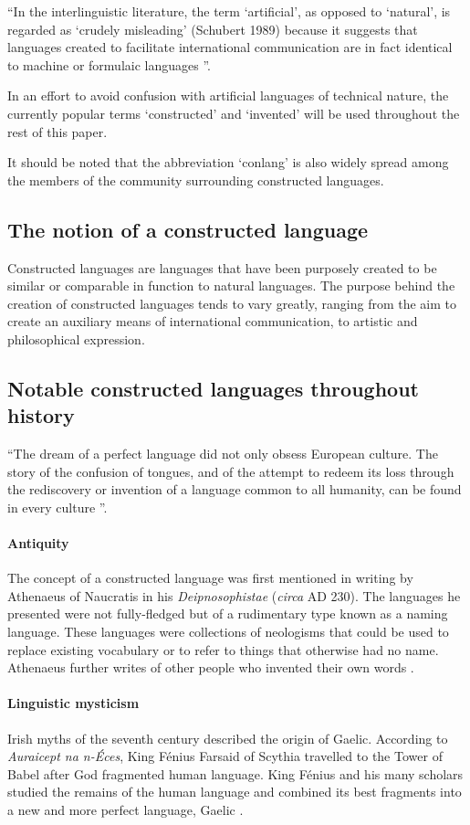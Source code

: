 \documentclass[14pt, a4paper]{extreport}
\begin{document}
``In the interlinguistic literature, the term `artificial', as opposed to `natural', is regarded as `crudely misleading' (Schubert 1989) because it suggests that languages created to facilitate international communication are in fact identical to machine or formulaic languages \parencite[45]{stria}''.

In an effort to avoid confusion with artificial languages of technical nature, the currently popular terms `constructed' and `invented' will be used throughout the rest of this paper.

It should be noted that the abbreviation `conlang' is also widely spread among the members of the community surrounding constructed languages.
\subsection{The notion of a constructed language}
Constructed languages are languages that have been purposely created to be similar or comparable in function to natural languages. The purpose behind the creation of constructed languages tends to vary greatly, ranging from the aim to create an auxiliary means of international communication, to artistic and philosophical expression.
    \subsection{Notable constructed languages throughout history}
``The dream of a perfect language did not only obsess European culture. The story of the confusion of tongues, and of the attempt to redeem its loss through the rediscovery or invention of a language common to all humanity, can be found in every culture \parencite[1]{eco}''.
        \paragraph{Antiquity}
The concept of a constructed language was first mentioned in writing by Athenaeus of Naucratis in his \textit{Deipnosophistae} (\textit{circa} \textsc{AD} 230). The languages he presented were not fully-fledged but of a rudimentary type known as a naming language. These languages were collections of neologisms that could be used to replace existing vocabulary or to refer to things that otherwise had no name. Athenaeus further writes of other people who invented their own words \parencite{sanders}.
        \paragraph{Linguistic mysticism}
Irish myths of the seventh century described the origin of Gaelic. According to \textit{Auraicept na n-Éces}, King Fénius Farsaid of Scythia travelled to the Tower of Babel after God fragmented human language. King Fénius and his many scholars studied the remains of the human language and combined its best fragments into a new and more perfect language, Gaelic \parencite{williams}.
\end{document}
